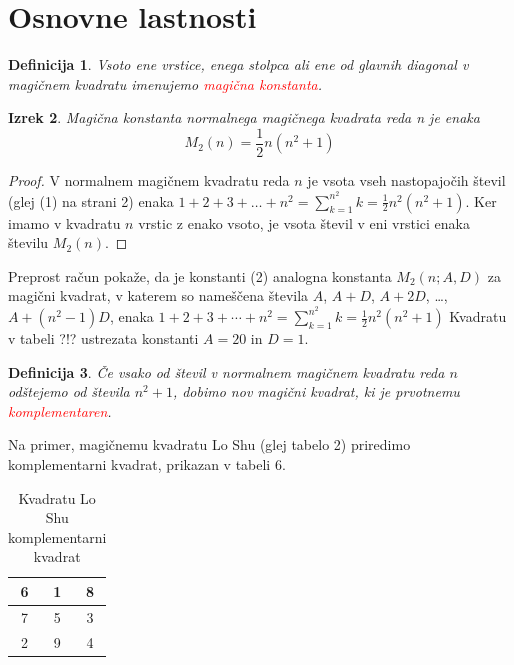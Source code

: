 \documentclass[a4paper,12pt]{article}
\newtheorem{izrek}{Izrek}[section]
\newtheorem{definicija}[izrek]{Definicija}
\begin{document}
\section{Osnovne lastnosti}

\begin{definicija}
      Vsoto ene vrstice, enega stolpca ali ene od glavnih diagonal
      v magičnem kvadratu imenujemo \textcolor{red}{\emph{magična konstanta}}.
\end{definicija}


\begin{izrek}
   
      Magična konstanta normalnega magičnega kvadrata reda n
      je enaka
      \begin{equation}
         M_2(n) = \frac{1}{2} n(n^2+1)
      \end{equation}
\end{izrek}



\begin{proof}
   
      V normalnem magičnem kvadratu reda $n$ je vsota vseh nastopajočih
      števil (glej (1) na strani 2) enaka
      $1+2+3+\dots+n^2=\sum_{k=1}^{n^2}k=\frac{1}{2}n^2(n^2+1)$. Ker imamo
      v kvadratu $n$ vrstic z enako vsoto, je vsota števil v eni vrstici
      enaka številu $M_2(n)$. %
\end{proof}


Preprost račun pokaže, da je konstanti (2) analogna konstanta
$M_2(n;A,D)$ za magični kvadrat, v katerem so nameščena števila
$A$, $A+D$, $A+2D$, \dots, $A+(n^2-1)D$, enaka %
$1 + 2 + 3 + \cdots + n^2 = \sum_{k=1}^{n^2} k = \frac{1}{2} n^2 (n^2 + 1)$
Kvadratu v tabeli ?!? ustrezata konstanti $A=20$ in $D=1$.

\begin{definicija}
      Če vsako od števil v normalnem magičnem kvadratu reda $n$ odštejemo
      od števila $n^2+1$, dobimo nov magični kvadrat, ki je prvotnemu
      \textcolor{red}{\emph{komplementaren}}.
\end{definicija}

Na primer, magičnemu kvadratu Lo Shu (glej tabelo 2) priredimo
komplementarni kvadrat, prikazan v tabeli 6.

\begin{table}[h]
\centering
\large
\caption{Kvadratu Lo Shu komplementarni kvadrat}
   \begin{tabular}{|c|c|c|}
      \hline
      6 & 1 & 8 \\\hline
      7 & 5 & 3 \\\hline
      2 & 9 & 4 \\\hline
   \end{tabular}
   \label{table:closhu}
\end{table}
\end{document}
